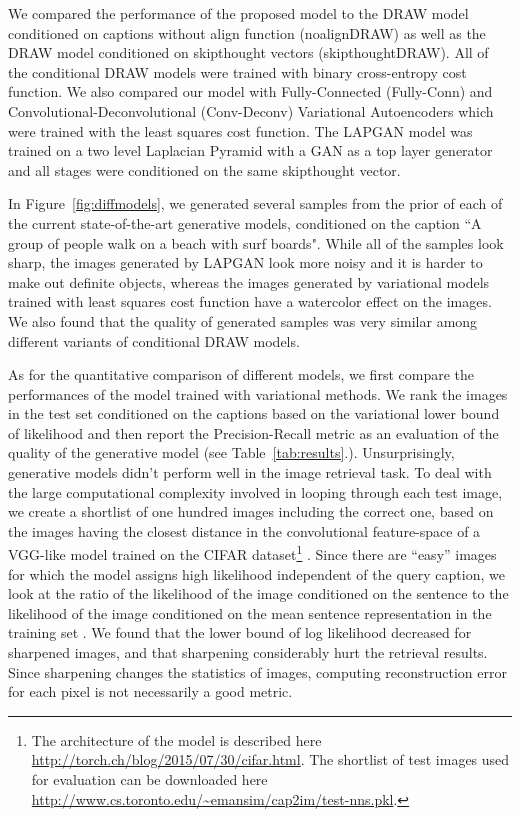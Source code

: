 \documentclass{article} %
\begin{document}
We compared the performance of the proposed model to the DRAW model conditioned on captions without align function (noalignDRAW) as well as the DRAW model conditioned on skipthought vectors \citep{kiros_skipthought} (skipthoughtDRAW). All of the conditional DRAW models were trained with binary cross-entropy cost function. We also compared our model with Fully-Connected (Fully-Conn) and Convolutional-Deconvolutional (Conv-Deconv) Variational Autoencoders which were trained with the least squares cost function. The LAPGAN model was trained on a two level Laplacian Pyramid with a GAN as a top layer generator and all stages were conditioned on the same skipthought vector.

In Figure~\ref{fig:diffmodels}, we generated several samples from the prior of each of the current state-of-the-art generative models, conditioned on the caption ``A group of people walk on a beach with surf boards". While all of the samples look sharp, the images generated by LAPGAN look more noisy and it is harder to make out definite objects, whereas the images generated by variational models trained with least squares cost function have a watercolor effect on the images. We also found that the quality of generated samples was very similar among different variants of conditional DRAW models.

As for the quantitative comparison of different models, we first compare the performances of the model trained with variational methods. We rank the images in the test set conditioned on the captions based on the variational lower bound of likelihood and then report the Precision-Recall metric as an evaluation of the quality of the generative model (see Table~\ref{tab:results}.). Unsurprisingly, generative models didn't perform well in the image retrieval task. To deal with the large computational complexity involved in looping through each test image, we create a shortlist of one hundred images including the correct one, based on the images having the closest distance in the convolutional feature-space of a VGG-like model \citep{simonyan_convnet} trained on the CIFAR dataset\footnote{The architecture of the model is described here \url{http://torch.ch/blog/2015/07/30/cifar.html}. The shortlist of test images used for evaluation can be downloaded here \url{http://www.cs.toronto.edu/~emansim/cap2im/test-nns.pkl}.} \citep{krizhevsky_cifar}. 
Since there are ``easy'' images for which the model assigns high likelihood independent of the query caption, we look at the ratio of the likelihood of the image conditioned on the sentence to the likelihood of the image conditioned on the mean sentence representation in the training set \citep{kiros_captions}.
We found that the lower bound of log likelihood decreased for sharpened images, and that sharpening considerably hurt the retrieval results. Since sharpening changes the statistics of images, computing reconstruction error for each pixel is not necessarily a good metric.
\end{document}
